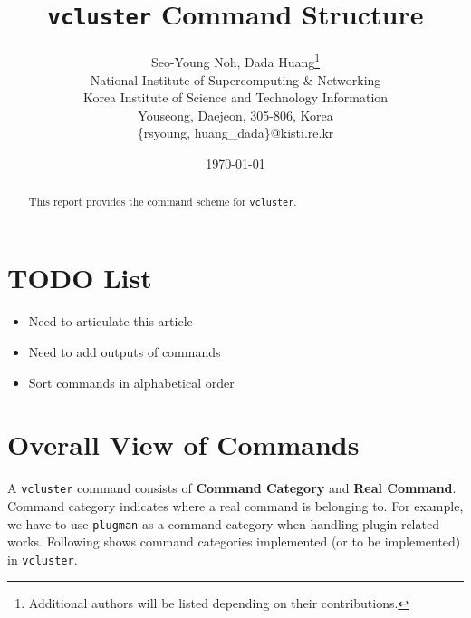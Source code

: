 \documentclass[11pt]{article}
\def \ttt{\texttt}
\def \tbf{\textbf}
\def \vb{\verb}
\begin{document}
\title{\ttt{vcluster} Command Structure}
\author{
        Seo-Young Noh, Dada Huang\thanks{Additional authors will be listed depending on their contributions.} \\
        $ $\\
        National Institute of Supercomputing \& Networking\\
        Korea Institute of Science and Technology Information\\
        Youseong, Daejeon, 305-806, Korea\\
        \{rsyoung, huang\_dada\}@kisti.re.kr
}
\date{\today}



\maketitle

\begin{abstract}
This report provides the command scheme for \ttt{vcluster}.
\end{abstract}


\section{TODO List}

\begin{itemize}
 \item Need to articulate this article
 \item Need to add outputs of commands
 \item Sort commands in alphabetical order
\end{itemize}




\section{Overall View of Commands}

A \vb+vcluster+ command consists of \tbf{Command Category} and \tbf{Real Command}. Command category indicates where a real command is belonging to. For example, we have to use \vb+plugman+ as a command category when handling plugin related works. Following shows command categories implemented (or to be implemented) in \vb+vcluster+.
\end{document}
